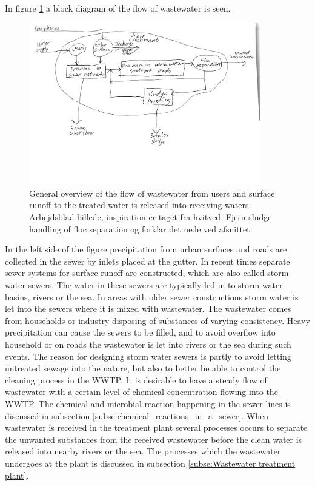 In figure \ref{fig:sewer_overview_of_the_different_parts} a block diagram of the flow of wastewater is seen.
\begin{figure}[H]
\centering
\includegraphics[width=0.9\textwidth]{report/introduction/pictures/sewer_process2.pdf}
\caption{General overview of the flow of wastewater from users and surface runoff to the treated water is released into receiving waters. Arbejdsblad billede, inspiration er taget fra hvitved. Fjern sludge handling of floc separation og forklar det nede ved afsnittet.}
\label{fig:sewer_overview_of_the_different_parts}
\end{figure}

In the left side of the figure precipitation from urban surfaces and roads are collected in the sewer by inlets placed at the gutter. In recent times separate sewer systems for surface runoff are constructed, which are also called storm water sewers. The water in these sewers are typically led in to storm water basins, rivers or the sea. In areas with older sewer constructions storm water is let into the sewers where it is mixed with wastewater. The wastewater comes from households or industry disposing of substances of varying consistency. Heavy precipitation can cause the sewers to be filled, and to avoid overflow into household or on roads the wastewater is let into rivers or the sea during such events. 
The reason for designing storm water sewers is partly to avoid letting untreated sewage into the nature, but also to better be able to control the cleaning process in the WWTP. It is desirable to have a steady flow of wastewater with a certain level of chemical concentration flowing into the WWTP. The chemical and microbial reaction happening in the sewer lines is discussed in subsection \ref{subse:chemical_reactions_in_a_sewer}. When wastewater is received in the treatment plant several processes occurs to separate the unwanted substances from the received wastewater before the clean water is released into nearby rivers or the sea. The processes which the wastewater undergoes at the plant is discussed in subsection \ref{subse:Wastewater treatment plant}.  

